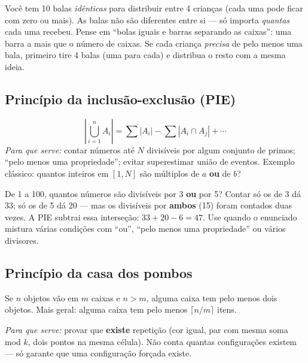 \begin{exemplodiabox}
Você tem 10 balas \emph{idênticas} para distribuir entre 4 crianças (cada uma pode ficar com zero ou mais). As balas não são diferentes entre si --- só importa \emph{quantas} cada uma recebeu. Pense em ``bolas iguais e barras separando as caixas'': uma barra a mais que o número de caixas. Se cada criança \emph{precisa} de pelo menos uma bala, primeiro tire 4 balas (uma para cada) e distribua o resto com a mesma ideia.
\end{exemplodiabox}



\subsection{Princípio da inclusão-exclusão (PIE)}

\begin{equation}
  \left|\bigcup_{i=1}^{n} A_i\right|
  = \sum |A_i| - \sum |A_i \cap A_j| + \cdots
\end{equation}
\emph{Para que serve:} contar números até $N$ divisíveis por algum conjunto de primos; ``pelo menos uma propriedade''; evitar superestimar união de eventos.
Exemplo clássico: quantos inteiros em $[1,N]$ são múltiplos de $a$ \textbf{ou} de $b$?

\begin{exemplodiabox}
De 1 a 100, quantos números são divisíveis por 3 \textbf{ou} por 5? Contar só os de 3 dá 33; só os de 5 dá 20 --- mas os divisíveis por \textbf{ambos} (15) foram contados duas vezes. A PIE subtrai essa interseção: $33 + 20 - 6 = 47$. Use quando o enunciado mistura várias condições com ``ou'', ``pelo menos uma propriedade'' ou vários divisores.
\end{exemplodiabox}



\subsection{Princípio da casa dos pombos}

Se $n$ objetos vão em $m$ caixas e $n > m$, alguma caixa tem pelo menos dois objetos.
Mais geral: alguma caixa tem pelo menos $\lceil n/m \rceil$ itens.

\emph{Para que serve:} provar que \textbf{existe} repetição (cor igual, par com mesma soma mod $k$, dois pontos na mesma célula).
Não conta quantas configurações existem --- só garante que uma configuração forçada existe.

